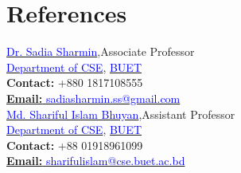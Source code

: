\documentclass[letterpaper,12pt]{article}
\newcommand{\resumeSubHeadingListEnd}{\end{itemize}}
\begin{document}

\section{References}
  \setlength\multicolsep{0pt}
  \begin{multicols}{2}
\href{https://cse.buet.ac.bd/faculty_list/detail/sadia}{\textcolor{blue}{Dr. Sadia Sharmin}},Associate Professor\\ 
\href{https://cse.buet.ac.bd/}{\textcolor{blue}{Department of CSE}}, \href{https://www.buet.ac.bd}{\textcolor{blue}{BUET}}\\
\textbf{Contact: }+880 1817108555\\ \href{mailto:sadiasharmin.ss@gmail.com}{\textbf{Email:} \textcolor{blue}{sadiasharmin.ss@gmail.com}}\\
\columnbreak
\href{https://cse.buet.ac.bd/faculty_list/detail/sharif}{\textcolor{blue}{Md. Shariful Islam Bhuyan}},Assistant Professor\\ 
\href{https://cse.buet.ac.bd/}{\textcolor{blue}{Department of CSE}}, \href{https://www.buet.ac.bd}{\textcolor{blue}{BUET}}\\
\textbf{Contact: }+88 01918961099\\ \href{mailto:sharifulislam@cse.buet.ac.bd}{\textbf{Email:} \textcolor{blue}{sharifulislam@cse.buet.ac.bd}}\\

\end{multicols}

\end{document}
